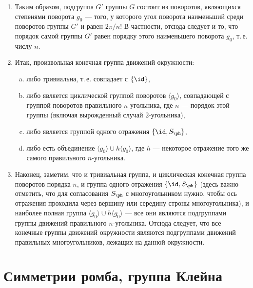\begin{enumerate}
\item Таким образом, подгруппа $G'$ группы $G$ состоит из поворотов, являющихся степенями поворота $g_0$ --- того, у которого угол поворота наименьший среди поворотов группы $G'$ и равен $2\pi/n$! В частности, отсюда следует и то, что порядок самой группы $G'$ равен порядку этого наименьшего поворота $g_0$, т.\,е. числу $n$.
\item Итак, произвольная конечная группа движений окружности:
\begin{enumerate}[a)]
\item либо тривиальна, т.\,е. совпадает с $\{\id\}$,
\item либо является циклической группой поворотов $\langle g_0\rangle$, совпадающей с группой поворотов правильного $n$-угольника, где $n$ --- порядок этой группы (включая вырожденный случай 2-угольника),
\item либо является группой одного отражения $\{\id,S_\ph\}$,
\item либо есть объединение $\langle g_0\rangle\cup h\langle g_0\rangle$, где $h$ --- некоторое отражение того же самого правильного $n$-угольника.
\end{enumerate}
\item Наконец, заметим, что и тривиальная группа, и циклическая конечная группа поворотов порядка $n$, и группа одного отражения $\{\id,S_\ph\}$ (здесь важно отметить, что для согласования $S_\ph$ с многоугольником нужно, чтобы ось отражения проходила через вершину или середину строны многоугольника), и наиболее полная группа $\langle g_0\rangle\cup h\langle g_0\rangle$  --- все они являются подгруппами группы движений правильного $n$-угольника. Отсюда следует, что все конечные группы движений окружности являются подгруппами движений правильных многоугольников, лежащих на данной окружности.
\end{enumerate}


\section{Симметрии ромба, группа Клейна}



